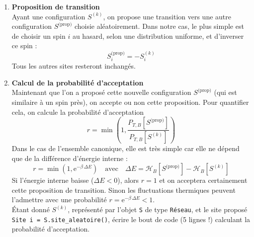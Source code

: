 \documentclass{book}
\newcommand{\inline}[1]{\texttt{#1}}
\begin{document}
\begin{enumerate}
  \item \textbf{Proposition de transition}\\
  Ayant une configuration $S^{(k)}$, on propose une transition vers une autre configuration $S^\text{(prop)}$ choisie aléatoirement. Dans notre cas, le plus simple est de choisir un spin $i$ au hasard, selon une distribution uniforme, et d'inverser ce spin :
  \begin{equation*}
    S^\text{(prop)}_i = -S^{(k)}_i
  \end{equation*}
  Tous les autres sites resteront inchangés.\\

  \item \textbf{Calcul de la probabilité d’acceptation}\\
  Maintenant que l'on a proposé cette nouvelle configuration $S^\text{(prop)}$ (qui est similaire à un spin près), on accepte ou non cette proposition. Pour quantifier cela, on calcule la probabilité d’acceptation
  \begin{equation*}
    r = \min\left( 1, \frac{P_{T,B}[S^\text{(prop)}]}{P_{T,B}[S^{(k)}]} \right)
  \end{equation*}
  Dans le cas de l'ensemble canonique, elle est très simple car elle ne dépend que de la différence d'énergie interne :
  \begin{equation*}
    r = \min\left( 1, \mathrm{e}^{-\beta\,\Delta E} \right) \quad \text{avec} \quad \Delta E = \mathcal{H}_B[S^\text{(prop)}]-\mathcal{H}_B[S^{(k)}]
  \end{equation*}
  Si l’énergie interne baisse ($\Delta E < 0$), alors $r=1$ et on acceptera certainement cette proposition de transition. Sinon les fluctuations thermiques peuvent l'admettre avec une probabilité $r = \mathrm{e}^{-\beta\,\Delta E} < 1$.\\Étant donné $S^{(k)}$, représenté par l'objet \inline{S} de type \inline{Réseau}, et le site proposé \inline{Site i = S.site_aleatoire()}, écrire le bout de code (5 lignes !) calculant la probabilité d'acceptation.\\


\end{enumerate}
\end{document}
